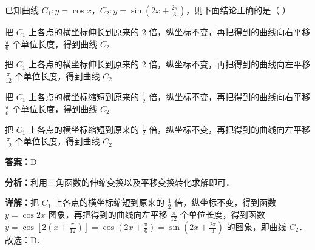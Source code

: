 \begin{question}[points=5]
已知曲线 $C_1:y=\cos x$，$C_2:y=\sin\left(2x+\frac{2\pi}{3}\right)$，则下面结论正确的是（ ）
\begin{choices}
  \item 把 $C_1$ 上各点的横坐标伸长到原来的 2 倍，纵坐标不变，再把得到的曲线向右平移 $\frac{\pi}{6}$ 个单位长度，得到曲线 $C_2$
  \item 把 $C_1$ 上各点的横坐标伸长到原来的 2 倍，纵坐标不变，再把得到的曲线向左平移 $\frac{\pi}{12}$ 个单位长度，得到曲线 $C_2$
  \item 把 $C_1$ 上各点的横坐标缩短到原来的 $\frac{1}{2}$ 倍，纵坐标不变，再把得到的曲线向右平移 $\frac{\pi}{6}$ 个单位长度，得到曲线 $C_2$
  \item 把 $C_1$ 上各点的横坐标缩短到原来的 $\frac{1}{2}$ 倍，纵坐标不变，再把得到的曲线向左平移 $\frac{\pi}{12}$ 个单位长度，得到曲线 $C_2$
\end{choices}
\begin{solution}
\textbf{答案：}D

\textbf{分析：}利用三角函数的伸缩变换以及平移变换转化求解即可．

\textbf{详解：}把 $C_1$ 上各点的横坐标缩短到原来的 $\frac{1}{2}$ 倍，纵坐标不变，得到函数 $y=\cos 2x$ 图象，再把得到的曲线向左平移 $\frac{\pi}{12}$ 个单位长度，得到函数 $y=\cos\left[2\left(x+\frac{\pi}{12}\right)\right]=\cos\left(2x+\frac{\pi}{6}\right)=\sin\left(2x+\frac{2\pi}{3}\right)$ 的图象，即曲线 $C_2$．故选：D．
\end{solution}
\end{question}


